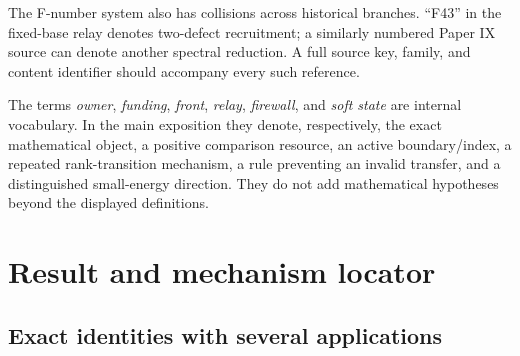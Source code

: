 \documentclass[
  10pt,
  a4paper,
  10pt,
  oneside,
  openany]{book}
\begin{document}
The F-number system also has collisions across historical branches.
``F43'' in the fixed-base relay denotes two-defect recruitment; a
similarly numbered Paper IX source can denote another spectral
reduction. A full source key, family, and content identifier should
accompany every such reference.

The terms \emph{owner}, \emph{funding}, \emph{front}, \emph{relay},
\emph{firewall}, and \emph{soft state} are internal vocabulary. In the
main exposition they denote, respectively, the exact mathematical
object, a positive comparison resource, an active boundary/index, a
repeated rank-transition mechanism, a rule preventing an invalid
transfer, and a distinguished small-energy direction. They do not add
mathematical hypotheses beyond the displayed definitions.

\section{Result and mechanism locator}\label{app-results}

\subsection{Exact identities with several
applications}\label{exact-identities-with-several-applications}
\end{document}
